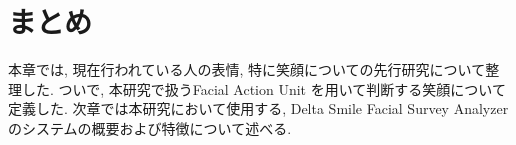 \section{まとめ}
本章では, 現在行われている人の表情, 特に笑顔についての先行研究について整理した.
ついで, 本研究で扱うFacial Action Unit を用いて判断する笑顔について定義した.
次章では本研究において使用する, Delta Smile Facial Survey Analyzer のシステムの概要および特徴について述べる.
